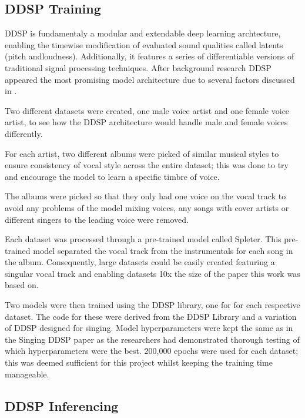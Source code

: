 \subsection{DDSP Training}

DDSP is fundamentaly a modular and extendable deep learning archtecture, enabling the timewise modification of evaluated sound qualities called latents (pitch andloudness). Additionally, it features a series of differentiable versions of traditional signal processing techniques. After background research DDSP appeared the most promising model architecture due to several factors discussed in .

Two different datasets were created, one male voice artist and one female voice artist, to see how the DDSP architecture would handle male and female voices differently.

For each artist, two different albums were picked of similar musical styles to ensure consistency of vocal style across the entire dataset; this was done to try and encourage the model to learn a specific timbre of voice.

The albums were picked so that they only had one voice on the vocal track to avoid any problems of the model mixing voices, any songs with cover artists or different singers to the leading voice were removed.

Each dataset was processed through a pre-trained model called Spleter\cite{Spleeter}. This pre-trained model separated the vocal track from the instrumentals for each song in the album. Consequently, large datasets could be easily created featuring a singular vocal track and enabling datasets 10x the size of the paper this work was based on\cite{SingingDDSP}.

Two models were then trained using the DDSP library\cite{DDSPPip}, one for for each respective dataset. The code for these were derived from the DDSP Library and a variation of DDSP designed for singing\cite{SingingDDSP}. Model hyperparameters were kept the same as in the Singing DDSP paper\cite{SingingDDSP} as the researchers had demonstrated thorough testing of which hyperparameters were the best. 200,000 epochs were used for each dataset; this was deemed sufficient for this project whilst keeping the training time manageable.

\subsection{DDSP Inferencing}

